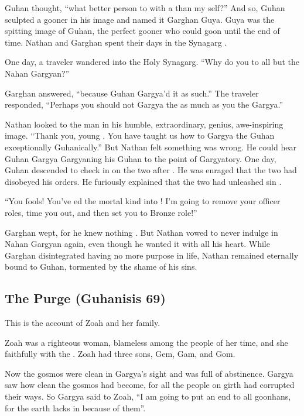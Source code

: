 \documentclass{article}
\begin{document}
Guhan thought, “what better person to  with a  than my  self?” And so, Guhan sculpted a gooner in his image and named it Garghan Guya. Guya was the spitting image of Guhan, the perfect gooner who could goon until the end of time. Nathan and Garghan spent their days in the Synagarg .

One day, a traveler wandered into the Holy Synagarg. “Why do you  to all but the Nahan Gargyan?”

Garghan answered, “because Guhan Gargya'd it as such.”
The traveler responded, “Perhaps you should not Gargya the  as much as you  the Gargya.”

Nathan looked to the man in his humble, extraordinary, genius, awe-inspiring image. “Thank you, young . You have taught us how to Gargya the Guhan exceptionally Guhanically.”
 But Nathan felt something was wrong. He could hear Guhan Gargya Gargyaning his Guhan to the point of Gargyatory.
One day, Guhan descended to check in on the two after . He was enraged that the two had disobeyed his orders. He furiously explained that the two had unleashed sin .

“You fools! You've ed the mortal kind into ! I'm going to remove your officer roles, time you out, and then set you to Bronze role!”

Garghan wept, for he knew nothing . But Nathan vowed to never indulge in Nahan Gargyan again, even though he wanted it with all his heart. While Garghan disintegrated having no more purpose in life, Nathan remained eternally bound to Guhan, tormented by the shame of his sins.


\subsection{The Purge (Guhanisis 69)}

This is the account of Zoah and her family.

Zoah was a righteous woman, blameless among the people of her time, and she  faithfully with the . Zoah had three sons, Gem, Gam, and Gom. 

Now the gosmos were clean in Gargya's sight and was full of abstinence. Gargya saw how clean the gosmos had become, for all the people on girth had corrupted their ways. So Gargya said to Zoah, “I am going to put an end to all goonhans, for the earth lacks in  because of them”. 
\end{document}
